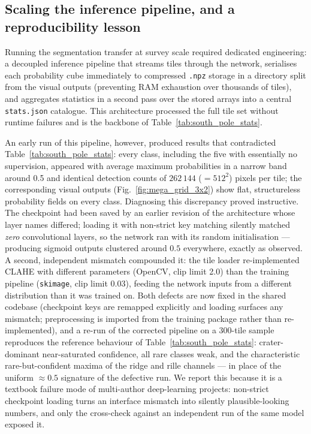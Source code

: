 \subsection{Scaling the inference pipeline, and a reproducibility lesson}
\label{sec:sp_pipeline}

Running the segmentation transfer at survey scale required dedicated engineering: a decoupled inference pipeline that streams tiles through the network, serialises each probability cube immediately to compressed \texttt{.npz} storage in a directory split from the visual outputs (preventing RAM exhaustion over thousands of tiles), and aggregates statistics in a second pass over the stored arrays into a central \texttt{stats.json} catalogue. This architecture processed the full tile set without runtime failures and is the backbone of Table~\ref{tab:south_pole_stats}.

An early run of this pipeline, however, produced results that contradicted Table~\ref{tab:south_pole_stats}: every class, including the five with essentially no supervision, appeared with average maximum probabilities in a narrow band around 0.5 and identical detection counts of $262\,144$ ($=512^2$) pixels per tile; the corresponding visual outputs (Fig.~\ref{fig:mega_grid_3x2}) show flat, structureless probability fields on every class. Diagnosing this discrepancy proved instructive. The checkpoint had been saved by an earlier revision of the architecture whose layer names differed; loading it with non-strict key matching silently matched \emph{zero} convolutional layers, so the network ran with its random initialisation --- producing sigmoid outputs clustered around $0.5$ everywhere, exactly as observed. A second, independent mismatch compounded it: the tile loader re-implemented CLAHE with different parameters (OpenCV, clip limit 2.0) than the training pipeline (\texttt{skimage}, clip limit 0.03), feeding the network inputs from a different distribution than it was trained on. Both defects are now fixed in the shared codebase (checkpoint keys are remapped explicitly and loading surfaces any mismatch; preprocessing is imported from the training package rather than re-implemented), and a re-run of the corrected pipeline on a 300-tile sample reproduces the reference behaviour of Table~\ref{tab:south_pole_stats}: crater-dominant near-saturated confidence, all rare classes weak, and the characteristic rare-but-confident maxima of the ridge and rille channels --- in place of the uniform $\approx 0.5$ signature of the defective run. We report this because it is a textbook failure mode of multi-author deep-learning projects: non-strict checkpoint loading turns an interface mismatch into silently plausible-looking numbers, and only the cross-check against an independent run of the same model exposed it.

